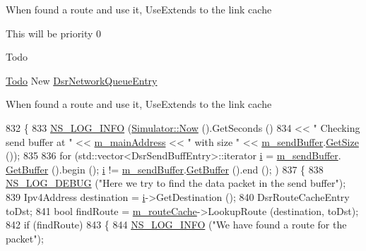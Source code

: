 When found a route and use it, Use\+Extends to the link cache

This will be priority 0

\begin{DoxyRefDesc}{Todo}
\item[\hyperlink{todo__todo000022}{Todo}]New \hyperlink{classns3_1_1dsr_1_1DsrNetworkQueueEntry}{Dsr\+Network\+Queue\+Entry} \end{DoxyRefDesc}


When found a route and use it, Use\+Extends to the link cache 
\begin{DoxyCode}
832 \{
833   \hyperlink{group__logging_gafbd73ee2cf9f26b319f49086d8e860fb}{NS\_LOG\_INFO} (\hyperlink{classns3_1_1Simulator_ac3178fa975b419f7875e7105be122800}{Simulator::Now} ().GetSeconds ()
834                << \textcolor{stringliteral}{" Checking send buffer at "} << \hyperlink{classns3_1_1dsr_1_1DsrRouting_a73182b5edee2d8460f28855e058fc9a0}{m\_mainAddress} << \textcolor{stringliteral}{" with size "} << 
      \hyperlink{classns3_1_1dsr_1_1DsrRouting_a887ae39d7060171753c0605d5c120549}{m\_sendBuffer}.\hyperlink{classns3_1_1dsr_1_1DsrSendBuffer_a0ecf75786eef7193fa5a5d84b2b7a1f0}{GetSize} ());
835 
836   \textcolor{keywordflow}{for} (std::vector<DsrSendBuffEntry>::iterator \hyperlink{bernuolliDistribution_8m_a6f6ccfcf58b31cb6412107d9d5281426}{i} = \hyperlink{classns3_1_1dsr_1_1DsrRouting_a887ae39d7060171753c0605d5c120549}{m\_sendBuffer}.
      \hyperlink{classns3_1_1dsr_1_1DsrSendBuffer_ad21223587fd6ae3a42b124416e877305}{GetBuffer} ().begin (); \hyperlink{bernuolliDistribution_8m_a6f6ccfcf58b31cb6412107d9d5281426}{i} != \hyperlink{classns3_1_1dsr_1_1DsrRouting_a887ae39d7060171753c0605d5c120549}{m\_sendBuffer}.\hyperlink{classns3_1_1dsr_1_1DsrSendBuffer_ad21223587fd6ae3a42b124416e877305}{GetBuffer} ().end (); )
837     \{
838       \hyperlink{group__logging_ga413f1886406d49f59a6a0a89b77b4d0a}{NS\_LOG\_DEBUG} (\textcolor{stringliteral}{"Here we try to find the data packet in the send buffer"});
839       Ipv4Address destination = \hyperlink{bernuolliDistribution_8m_a6f6ccfcf58b31cb6412107d9d5281426}{i}->GetDestination ();
840       DsrRouteCacheEntry toDst;
841       \textcolor{keywordtype}{bool} findRoute = \hyperlink{classns3_1_1dsr_1_1DsrRouting_ac409bdb961b9fff0fb63ebd026be99ad}{m\_routeCache}->LookupRoute (destination, toDst);
842       \textcolor{keywordflow}{if} (findRoute)
843         \{
844           \hyperlink{group__logging_gafbd73ee2cf9f26b319f49086d8e860fb}{NS\_LOG\_INFO} (\textcolor{stringliteral}{"We have found a route for the packet"});

\end{DoxyCode}
